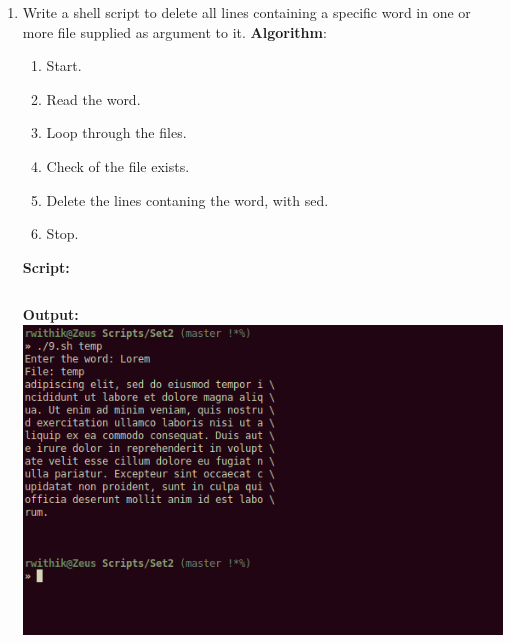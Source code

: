 \documentclass[10pt,a4paper,titlepage]{report}
\begin{document}
\begin{enumerate}
\item Write a shell script to delete all lines containing a specific word in one or more file supplied as argument to it. \newline
\textbf{Algorithm}:\newline
\begin{enumerate}
	\item Start.
	\item Read the word.
	\item Loop through the files.
	\item Check of the file exists.
	\item Delete the lines contaning the word, with {\color{red}sed}.
	\item Stop.
\end{enumerate}
\newline
\textbf{Script:}\newline
\inputminted{bash}{../Scripts/Set2/9.sh}
\newline
\textbf{Output:}\newline
\includegraphics[width=\linewidth]{../Images/Shell2/9.png}
\end{enumerate}
\end{document}
